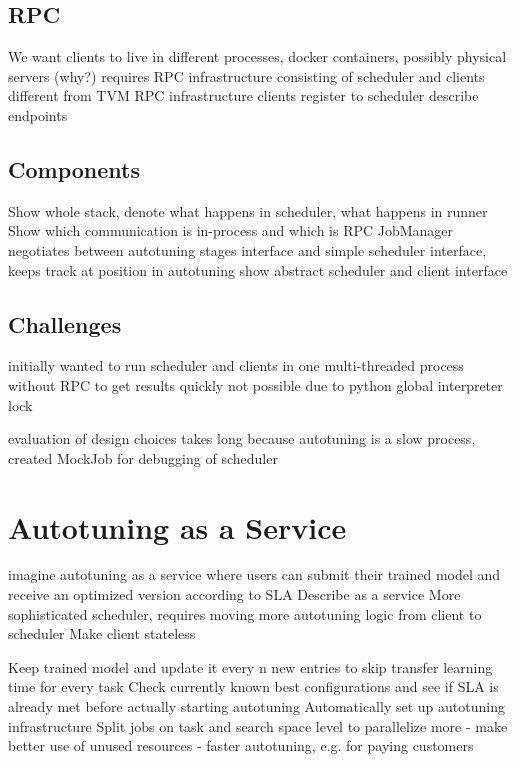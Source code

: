 \subsection{RPC}
We want clients to live in different processes, docker containers, possibly physical servers (why?)
requires RPC infrastructure consisting of scheduler and clients
different from TVM RPC infrastructure
clients register to scheduler
describe endpoints

\subsection{Components}
Show whole stack, denote what happens in scheduler, what happens in runner
Show which communication is in-process and which is RPC
JobManager negotiates between autotuning stages interface and simple scheduler interface, keeps track at position in autotuning
show abstract scheduler and client interface

\subsection{Challenges}
initially wanted to run scheduler and clients in one multi-threaded process without RPC to get results quickly
not possible due to python global interpreter lock

evaluation of design choices takes long because autotuning is a slow process, created MockJob for debugging of scheduler

\section{Autotuning as a Service}
imagine autotuning as a service where users can submit their trained model and receive an optimized version according to SLA
Describe as a service
More sophisticated scheduler, requires moving more autotuning logic from client to scheduler
Make client stateless

Keep trained model and update it every n new entries to skip transfer learning time for every task
Check currently known best configurations and see if SLA is already met before actually starting autotuning
Automatically set up autotuning infrastructure
Split jobs on task and search space level to parallelize more
- make better use of unused resources
- faster autotuning, e.g. for paying customers